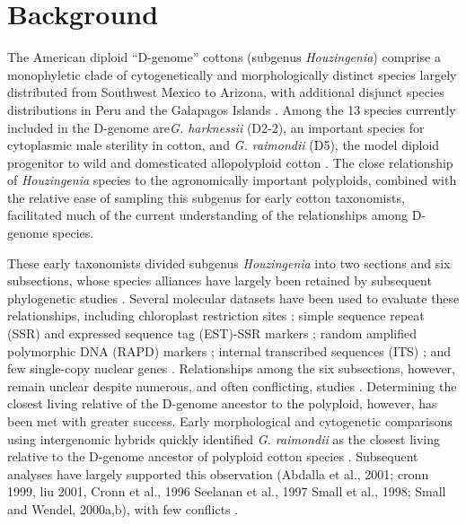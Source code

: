 \documentclass{bmcart}
\newcommand{\note}[2][]{\added[id=#1,remark={#2}]{}}
\begin{document}
\section*{Background}
The American diploid “D-genome” cottons (subgenus \textit{Houzingenia}) comprise a monophyletic clade of cytogenetically and morphologically distinct species largely distributed from Southwest Mexico to Arizona, with additional disjunct species distributions in Peru and the Galapagos Islands \note[Corrinne]{which citations here, Endrizzi et al 1985}. Among the 13 species currently included in the D-genome \note[Corrinne]{although see Ulloa 2013} are\textit{G. harknessii} (D2-2), an important species for cytoplasmic male sterility in cotton, and \textit{G. raimondii} (D5), the model diploid progenitor to wild and domesticated allopolyploid cotton \note[Corrinne]{Endrizzi 1985, others?}. The close relationship of \textit{Houzingenia} species to the agronomically important polyploids, combined with the relative ease of sampling this subgenus for early cotton taxonomists, facilitated much of the current understanding of the relationships among D-genome species. 

These early taxonomists divided subgenus \textit{Houzingenia} into two sections and six subsections, whose species alliances have largely been retained by subsequent phylogenetic studies \note[Corrinne]{Cronn et al., 1996; Seelanan et al., 1997; Small and Wendel, 2000b; Wendel and Albert, 1992; Wendel et al., 1995b; alvarez 2005}. Several molecular datasets have been used to evaluate these relationships, including chloroplast restriction sites \note[Corrinne]{citation}; simple sequence repeat (SSR) and expressed sequence tag (EST)-SSR markers \note[Corrinne]{citation}; random amplified polymorphic DNA (RAPD) markers \note[Corrinne]{citation}; internal transcribed sequences (ITS) \note[Corrinne]{citation}; and few single-copy nuclear genes \note[Corrinne]{citation}. Relationships among the six subsections, however, remain unclear despite numerous, and often conflicting, studies \note[Corrinne]{Cronn et al., 1996; Liu et al., 2001b; Small and Wendel, 2000b more citations}. Determining the closest living relative of the D-genome ancestor to the polyploid, however, has been met with greater success. Early morphological and cytogenetic comparisons using intergenomic hybrids quickly identified \textit{G. raimondii} as the closest living relative to the D-genome ancestor of polyploid cotton species \note[Corrinne]{Stephens, 1944b Hutchinson et al., 1945, 1947 ; Gerstel and Phillips, 1958; Phillips, 1964; reviewed in Wendel and Cronn 2003}. Subsequent analyses have largely supported this observation (Abdalla et al., 2001; cronn 1999, liu 2001, Cronn et al., 1996 Seelanan et al., 1997 Small et al., 1998; Small and Wendel, 2000a,b), with few conflicts \note[Corrinne]{see, however Wendel et al., 1995b; I know there are others…. What are they?}.
\end{document}
